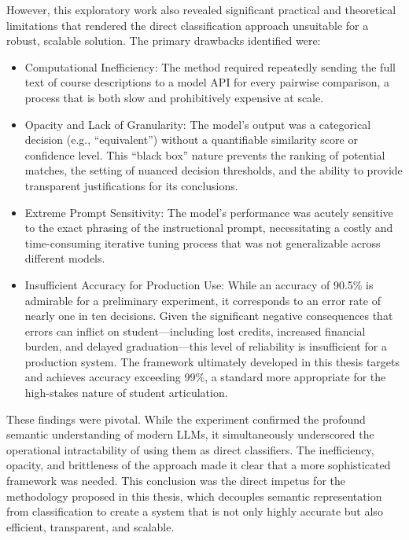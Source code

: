 However, this exploratory work also revealed significant practical and theoretical limitations that rendered the direct classification approach unsuitable for a robust, scalable solution. The primary drawbacks identified were:
\begin{itemize}
    \item Computational Inefficiency: The method required repeatedly sending the full text of course descriptions to a model API for every pairwise comparison, a process that is both slow and prohibitively expensive at scale.
    \item Opacity and Lack of Granularity: The model's output was a categorical decision (e.g., ``equivalent'') without a quantifiable similarity score or confidence level. This ``black box'' nature prevents the ranking of potential matches, the setting of nuanced decision thresholds, and the ability to provide transparent justifications for its conclusions.
    \item Extreme Prompt Sensitivity: The model's performance was acutely sensitive to the exact phrasing of the instructional prompt, necessitating a costly and time-consuming iterative tuning process that was not generalizable across different models.
    \item Insufficient Accuracy for Production Use: While an accuracy of 90.5\% is admirable for a preliminary experiment, it corresponds to an error rate of nearly one in ten decisions. Given the significant negative consequences that errors can inflict on student---including lost credits, increased financial burden, and delayed graduation---this level of reliability is insufficient for a production system. The framework ultimately developed in this thesis targets and achieves accuracy exceeding 99\%, a standard more appropriate for the high-stakes nature of student articulation.
\end{itemize}

These findings were pivotal. While the experiment confirmed the profound semantic understanding of modern LLMs, it simultaneously underscored the operational intractability of using them as direct classifiers. The inefficiency, opacity, and brittleness of the approach made it clear that a more sophisticated framework was needed. This conclusion was the direct impetus for the methodology proposed in this thesis, which decouples semantic representation from classification to create a system that is not only highly accurate but also efficient, transparent, and scalable.

